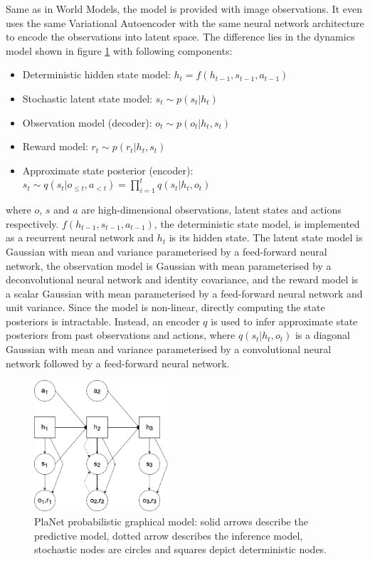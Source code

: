 Same as in World Models, the model is provided with image observations. It even uses the same Variational Autoencoder with the same neural network architecture to encode the observations into latent space. The difference lies in the dynamics model shown in figure \ref{Fig.PlaNetPGM} with following components:
\begin{itemize}
\item Deterministic hidden state model:      $h_t = f(h_{t-1}, s_{t-1}, a_{t-1})$
\item Stochastic latent state model:         $s_t \sim p(s_t|h_t)$
\item Observation model (decoder):           $o_t \sim p(o_t|h_t, s_t)$
\item Reward model:                          $r_t \sim p(r_t|h_t, s_t)$
\item Approximate state posterior (encoder): $s_t \sim q(s_t|o_{\leqslant t}, a_{< t}) = \prod_{i=1}^tq(s_t|h_t,o_t)$
\end{itemize}
where $o$, $s$ and $a$ are high-dimensional observations, latent states and actions respectively. $f(h_{t-1}, s_{t-1}, a_{t-1})$, the deterministic state model, is implemented as a recurrent neural network and $h_t$ is its hidden state. The latent state model is Gaussian with mean and variance parameterised by a feed-forward neural network, the observation model is Gaussian with mean parameterised by a deconvolutional neural network and identity covariance, and the reward model is a scalar Gaussian with mean parameterised by a feed-forward neural network and unit variance. Since the model is non-linear, directly computing the state posteriors is intractable. Instead, an encoder $q$ is used to infer approximate state posteriors from past observations and actions, where $q(s_t | h_t, o_t)$ is a diagonal Gaussian with mean and variance parameterised by a convolutional neural network followed by a feed-forward neural network.

\begin{figure}[H]
\includegraphics[width=0.45\textwidth,keepaspectratio]{figures/PlaNet/prob_graph_model.png}
\caption[World Models probabilistic graphical model]{PlaNet probabilistic graphical model: solid arrows describe the predictive model, dotted arrow describes the inference model, stochastic nodes are circles and squares depict deterministic nodes.}
\label{Fig.PlaNetPGM}
\end{figure}

